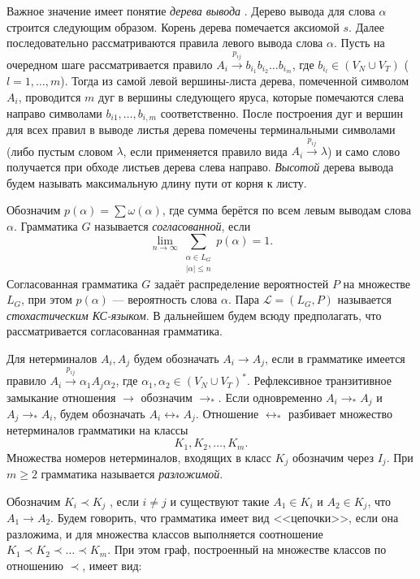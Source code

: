 \documentclass[12pt]{article}
\renewcommand{\leq}{\leqslant}
\renewcommand{\geq}{\geqslant}
\begin{document}
Важное значение имеет понятие \textit{дерева вывода} \cite{aho-ulman-syntax}. Дерево вывода для слова $\alpha$ строится следующим образом. Корень дерева помечается аксиомой $s$. Далее последовательно рассматриваются правила левого вывода слова $\alpha$. Пусть на очередном шаге рассматривается правило $A_i \xrightarrow{p_{ij}} b_{i_1} b_{i_2} \ldots b_{i_m}$, где $b_{i_l} \in (V_N \cup V_T)$ ($l = 1,\ldots,m$). Тогда из самой левой вершины-листа дерева, помеченной символом $A_i$, проводится $m$ дуг в вершины следующего яруса, которые помечаются слева направо символами $b_{i1}, \ldots, b_{i,m}$ соответственно. После построения дуг и вершин для всех правил в выводе листья дерева помечены терминальными символами (либо пустым словом $\lambda$, если применяется правило вида $A_i \xrightarrow{p_{ij}} \lambda$) и само слово получается при обходе листьев дерева слева направо. \textit{Высотой} дерева вывода будем называть максимальную длину пути от корня к листу.

Обозначим $p(\alpha) = \sum \omega(\alpha)$, где сумма берётся по всем левым выводам слова $\alpha$. Грамматика $G$ называется \textit{согласованной}, если
\begin{equation}
\label{eq:soglas}
	\lim_{n \rightarrow \infty} \sum_{\substack{\alpha \in L_G\\\left|\alpha\right| \leq n}} p(\alpha) = 1.
\end{equation}
Согласованная грамматика $G$ задаёт распределение вероятностей $P$ на множестве $L_G$, при этом $p(\alpha)$ --- вероятность слова $\alpha$. Пара $\mathcal{L} = (L_G, P)$ называется \textit{стохастическим КС-языком}. В дальнейшем будем всюду предполагать, что рассматривается согласованная грамматика.

Для нетерминалов $A_i, A_j$ будем обозначать $A_i \rightarrow A_j$, если в грамматике имеется правило $A_i \xrightarrow{p_{ij}} \alpha_1 A_j \alpha_2$, где $\alpha_1, \alpha_2 \in (V_N \cup V_T)^*$. Рефлексивное транзитивное замыкание отношения $\rightarrow$ обозначим $\rightarrow_*$. Если одновременно $A_i \rightarrow_* A_j$ и $A_j \rightarrow_* A_i$, будем обозначать $A_i \leftrightarrow_* A_j$. Отношение $\leftrightarrow_*$ разбивает множество нетерминалов грамматики на классы
\begin{equation}
	K_1, K_2, \ldots, K_m.
\end{equation}
Множества номеров нетерминалов, входящих в класс $K_j$ обозначим через $I_j$. При $m \geq 2$ грамматика называется \textit{разложимой}.

Обозначим $K_i \prec K_j$ , если $i \neq j$ и существуют такие $A_1 \in K_i$ и $A_2 \in K_j$, что $A_1 \rightarrow A_2$. Будем говорить, что грамматика имеет вид <<цепочки>>, если она разложима, и для множества классов выполняется соотношение $K_1 \prec K_2 \prec \ldots \prec K_m$. При этом граф, построенный на множестве классов по отношению $\prec$, имеет вид:
\end{document}
